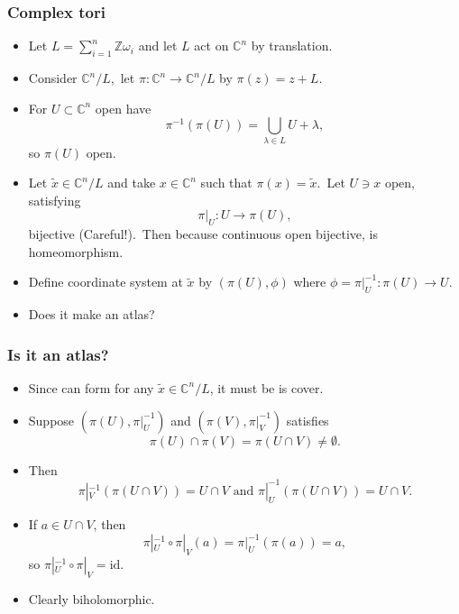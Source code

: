 \documentclass[usenames,dvipsnames]{beamer}
\theoremstyle{definition}
\begin{document}
\begin{frame}
  \frametitle{Complex tori}
  \begin{itemize}
    \item Let $L=\sum_{i=1}^n\mathbb{Z}\omega_i$ and let $L$ act on $\mathbb{C}^n$ by translation.\pause
    \item Consider $\mathbb{C}^n/L$,\pause~let $\pi:\mathbb{C}^n\to\mathbb{C}^n/L$ by $\pi(z)=z+L$.\pause
    \item For $U\subset\mathbb{C}^n$ open have\pause
      \[\pi^{-1}(\pi(U))=\bigcup_{\lambda\in L}U+\lambda,\]\pause
      so $\pi(U)$ open.\pause
    \item Let $\tilde{x}\in\mathbb{C}^n/L$ and take $x\in\mathbb{C}^n$ such that $\pi(x)=\tilde{x}$.\pause~Let $U\ni x$ open, satisfying\pause
      \[\pi|_U:U\to\pi(U),\]\pause
      bijective (Careful!).\pause~Then because continuous open bijective, is homeomorphism.\pause
    \item Define coordinate system at $\tilde{x}$ by $(\pi(U),\phi)$ where $\phi=\pi|_U^{-1}:\pi(U)\to U$.\pause
    \item Does it make an atlas?
  \end{itemize}
\end{frame}

\begin{frame}
  \frametitle{Is it an atlas?}
  \begin{itemize}
    \item Since can form for any $\tilde{x}\in\mathbb{C}^n/L$, it must be is cover.\pause
    \item Suppose $(\pi(U),\pi|_U^{-1})$ and $(\pi(V),\pi|_V^{-1})$ satisfies\pause
      \[\pi(U)\cap\pi(V)=\pi(U\cap V)\neq\emptyset.\]\pause
    \item Then\pause
      \[\pi|_V^{-1}(\pi(U\cap V))=U\cap V\text{ and }\pi|_U^{-1}(\pi(U\cap V))=U\cap V.\]\pause
    \item If $a\in U\cap V$, then
      \[\pi|_U^{-1}\circ\pi|_V(a)=\pi|_U^{-1}(\pi(a))=a,\]\pause
      so $\pi|_U^{-1}\circ\pi|_V=\mathrm{id}$.\pause
    \item Clearly biholomorphic.
  \end{itemize}
\end{frame}
\end{document}
